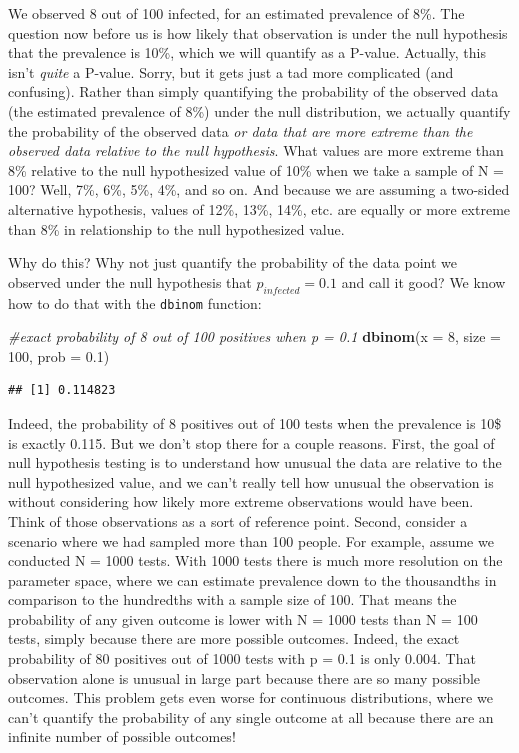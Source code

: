 \documentclass[
]{book}
\newenvironment{Shaded}{\begin{snugshade}}{\end{snugshade}}
\newcommand{\AttributeTok}[1]{\textcolor[rgb]{0.13,0.29,0.53}{#1}}
\newcommand{\CommentTok}[1]{\textcolor[rgb]{0.56,0.35,0.01}{\textit{#1}}}
\newcommand{\DecValTok}[1]{\textcolor[rgb]{0.00,0.00,0.81}{#1}}
\newcommand{\FloatTok}[1]{\textcolor[rgb]{0.00,0.00,0.81}{#1}}
\newcommand{\FunctionTok}[1]{\textcolor[rgb]{0.13,0.29,0.53}{\textbf{#1}}}
\newcommand{\NormalTok}[1]{#1}
\begin{document}
We observed 8 out of 100 infected, for an estimated prevalence of 8\%. The question now before us is how likely that observation is under the null hypothesis that the prevalence is 10\%, which we will quantify as a P-value. Actually, this isn't \emph{quite} a P-value. Sorry, but it gets just a tad more complicated (and confusing). Rather than simply quantifying the probability of the observed data (the estimated prevalence of 8\%) under the null distribution, we actually quantify the probability of the observed data \emph{or data that are more extreme than the observed data relative to the null hypothesis}. What values are more extreme than 8\% relative to the null hypothesized value of 10\% when we take a sample of N = 100? Well, 7\%, 6\%, 5\%, 4\%, and so on. And because we are assuming a two-sided alternative hypothesis, values of 12\%, 13\%, 14\%, etc. are equally or more extreme than 8\% in relationship to the null hypothesized value.

Why do this? Why not just quantify the probability of the data point we observed under the null hypothesis that \(p_{infected} = 0.1\) and call it good? We know how to do that with the \texttt{dbinom} function:

\begin{Shaded}
\begin{Highlighting}[]
\CommentTok{\#exact probability of 8 out of 100 positives when p = 0.1}
\FunctionTok{dbinom}\NormalTok{(}\AttributeTok{x =} \DecValTok{8}\NormalTok{, }\AttributeTok{size =} \DecValTok{100}\NormalTok{, }\AttributeTok{prob =} \FloatTok{0.1}\NormalTok{)}
\end{Highlighting}
\end{Shaded}

\begin{verbatim}
## [1] 0.114823
\end{verbatim}

Indeed, the probability of 8 positives out of 100 tests when the prevalence is 10\$ is exactly 0.115. But we don't stop there for a couple reasons. First, the goal of null hypothesis testing is to understand how unusual the data are relative to the null hypothesized value, and we can't really tell how unusual the observation is without considering how likely more extreme observations would have been. Think of those observations as a sort of reference point. Second, consider a scenario where we had sampled more than 100 people. For example, assume we conducted N = 1000 tests. With 1000 tests there is much more resolution on the parameter space, where we can estimate prevalence down to the thousandths in comparison to the hundredths with a sample size of 100. That means the probability of any given outcome is lower with N = 1000 tests than N = 100 tests, simply because there are more possible outcomes. Indeed, the exact probability of 80 positives out of 1000 tests with p = 0.1 is only 0.004. That observation alone is unusual in large part because there are so many possible outcomes. This problem gets even worse for continuous distributions, where we can't quantify the probability of any single outcome at all because there are an infinite number of possible outcomes!
\end{document}
